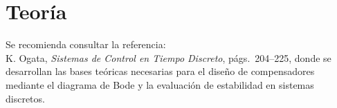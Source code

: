 \section{Teoría}
Se recomienda consultar la referencia: \\
K. Ogata, \textit{Sistemas de Control en Tiempo Discreto}, págs.\ 204--225, donde se desarrollan las bases teóricas necesarias para el diseño de compensadores mediante el diagrama de Bode y la evaluación de estabilidad en sistemas discretos.